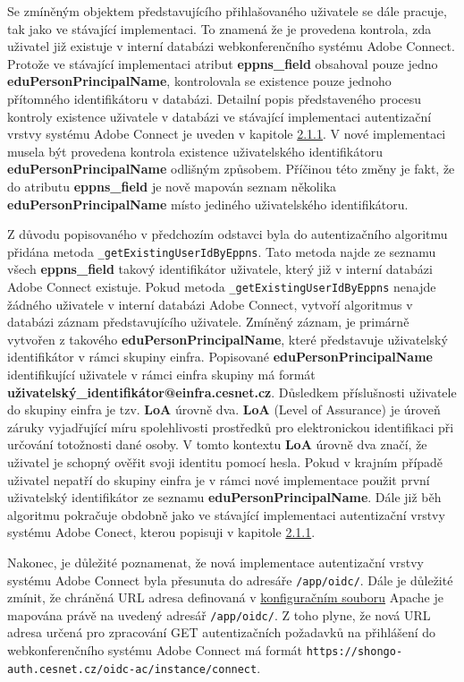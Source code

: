 \documentclass[
  printed, %
  twoside, %
  table,   %
  nolof,     %
  nolot,     %
]{fithesis3}
\begin{document}
Se zmíněným objektem představujícího přihlašovaného uživatele se dále pracuje, tak jako ve stávající implementaci. To znamená že je provedena kontrola, zda uživatel již existuje v interní databázi webkonferenčního systému Adobe Connect. Protože ve stávající implementaci atribut \textbf{eppns\_field} obsahoval pouze jedno \textbf{eduPersonPrincipalName}, kontrolovala se existence pouze jednoho přítomného identifikátoru v databázi. Detailní popis představeného procesu kontroly existence uživatele v databázi ve stávající implementaci autentizační vrstvy systému Adobe Connect je uveden v kapitole \hyperref[ac-old]{2.1.1}. V nové implementaci musela být provedena kontrola existence uživatelského identifikátoru \textbf{eduPersonPrincipalName} odlišným způsobem. Příčinou této změny je fakt, že do atributu \textbf{eppns\_field} je nově mapován seznam několika \textbf{eduPersonPrincipalName} místo jediného uživatelského identifikátoru.
\par
Z důvodu popisovaného v předchozím odstavci byla do autentizačního algoritmu přidána metoda \texttt{\_getExistingUserIdByEppns}. Tato metoda najde ze seznamu všech \textbf{eppns\_field} takový identifikátor uživatele, který již v interní databázi Adobe Connect existuje. Pokud metoda \texttt{\_getExistingUserIdByEppns} nenajde žádného uživatele v interní databázi Adobe Connect, vytvoří algoritmus v databázi záznam představujícího uživatele. Zmíněný záznam, je primárně vytvořen z takového \textbf{eduPersonPrincipalName}, které představuje uživatelský identifikátor v rámci skupiny einfra. Popisované \textbf{eduPersonPrincipalName} identifikující uživatele v rámci einfra skupiny má formát \textbf{{uživatelský\_identifikátor}@einfra.cesnet.cz}. Důsledkem příslušnosti uživatele do skupiny einfra je tzv. \textbf{LoA} úrovně dva. \textbf{LoA} (Level of Assurance) \cite{rfc6711} je úroveň záruky vyjadřující míru spolehlivosti prostředků pro
elektronickou identifikaci při určování totožnosti dané osoby. V tomto kontextu \textbf{LoA} úrovně dva značí, že uživatel je schopný ověřit svoji identitu pomocí hesla.  Pokud v krajním případě uživatel nepatří do skupiny einfra je v rámci nové implementace použit první uživatelský identifikátor ze seznamu \textbf{eduPersonPrincipalName}. Dále již běh algoritmu pokračuje obdobně jako ve stávající implementaci autentizační vrstvy systému Adobe Conect, kterou popisuji v kapitole \hyperref[ac-old]{2.1.1}. 


\par 
Nakonec, je důležité poznamenat, že nová implementace autentizační vrstvy systému Adobe Connect byla přesunuta do adresáře \texttt{/app/oidc/}. Dále je důležité zmínit, že chráněná URL adresa definovaná v \hyperref[ac-location]{konfiguračním souboru} Apache je mapována právě na uvedený adresář \texttt{/app/oidc/}. Z toho plyne, že nová URL adresa určená pro zpracování GET autentizačních požadavků na přihlášení do webkonferenčního systému Adobe Connect má formát \texttt{https://shongo-auth.cesnet.cz/oidc-ac/instance/connect}.
\end{document}
